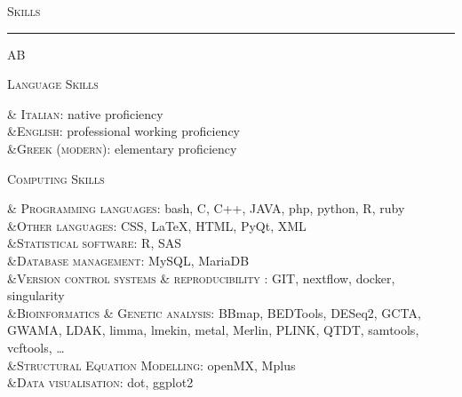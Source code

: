 \documentclass[a4paper,10pt]{article}
\newcommand{\mediumtitle}[1]{
	\vspace{0.2cm}
	{\noindent
	\Large \textsc{#1}\\[-2ex]
	\hrule
	\vspace{0.2cm}}
}
\newenvironment{doubletablelist}
{
	\vspace{-0.2cm}
	\begin{longtable}[!h]{AB}}{\end{longtable}
}
\newcommand{\dtlist}[2]{
\hspace{-3cm}
\noindent
	\begin{minipage}{0.22\textwidth}
	\begin{flushright}
	\textsc{#1}
	\end{flushright}
	\end{minipage}
	& #2\\[0.2cm]
}
\begin{document}

\mediumtitle{Skills}
\begin{doubletablelist}
	\dtlist{Language Skills}{\textsc{Italian}: native proficiency \\ 
							&\textsc{English}: professional working proficiency\\
							&\textsc{Greek (modern)}: elementary proficiency}
	\dtlist{Computing Skills}{\textsc{Programming languages}: bash, C, C++, JAVA, php, python, R, ruby\\
							&\textsc{Other languages}: CSS, \LaTeX, HTML, PyQt, XML\\
							&\textsc{Statistical software}: R, SAS\\
							&\textsc{Database management}: MySQL, MariaDB\\
							&\textsc{Version control systems \& reproducibility }: GIT, nextflow, docker, singularity\\
							&\textsc{Bioinformatics \& Genetic analysis}: BBmap, BEDTools, DESeq2, GCTA, GWAMA, LDAK, limma, lmekin, metal, Merlin, PLINK, QTDT, samtools, vcftools, \dots\\
							&\textsc{Structural Equation Modelling}: openMX, Mplus\\
							&\textsc{Data visualisation}: dot, ggplot2}
\end{doubletablelist}

\newpage

\end{document}
